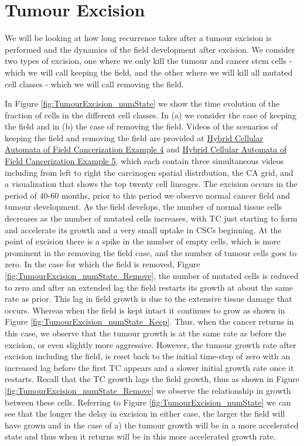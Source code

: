 \documentclass[\main/thesis.tex]{subfiles}
\begin{document}
\section{Tumour Excision}
We will be looking at how long recurrence takes after a tumour excision is performed and the dynamics of the field development after excision. We consider two types of excision, one where we only kill the tumour and cancer stem cells - which we will call keeping the field, and the other where we will kill all mutated cell classes - which we will call removing the field. 

In Figure \ref{fig:TumourExcision_numState} we show the time evolution of the fraction of cells in the different cell classes. In (a) we consider the case of keeping the field and in (b) the case of removing the field. Videos of the scenarios of keeping the field and removing the field are provided at \href{https://youtu.be/zngGzjSlPwU}{Hybrid Cellular Automata of Field Cancerization Example 4} and \href{https://youtu.be/EOFI4Ai1A9U}{Hybrid Cellular Automata of Field Cancerization Example 5}, which each contain three simultaneous videos including from left to right the carcinogen spatial distribution, the CA grid, and a visualization that shows the top twenty cell lineages. The excision occurs in the period of 40-60 months, prior to this period we observe normal cancer field and tumour development. As the field develops, the number of normal tissue cells decreases as the number of mutated cells increases, with TC just starting to form and accelerate its growth and a very small uptake in CSCs beginning. At the point of excision there is a spike in the number of empty cells, which is more prominent in the removing the field case, and the number of tumour cells goes to zero. In the case for which the field is removed, Figure \ref{fig:TumourExcision_numState_Remove}, the number of mutated cells is reduced to zero and after an extended lag the field restarts its growth at about the same rate as prior. This lag in field growth is due to the extensive tissue damage that occurs. Whereas when the field is kept intact it continues to grow as shown in Figure \ref{fig:TumourExcision_numState_Keep}. Thus, when the cancer returns in this case, we observe that the tumour growth is at the same rate as before the excision, or even slightly more aggressive. However, the tumour growth rate after excision including the field, is reset back to the initial time-step of zero with an increased lag before the first TC appears and a slower initial growth rate once it restarts. Recall that the TC growth lags the field growth, thus as shown in Figure \ref{fig:TumourExcision_numState_Remove} we observe the relationship in growth between these cells. Referring to Figure \ref{fig:TumourExcision_numState} we can see that the longer the delay in excision in either case, the larger the field will have grown and in the case of a) the tumour growth will be in a more accelerated state and thus when it returns will be in this more accelerated growth rate.
\end{document}
